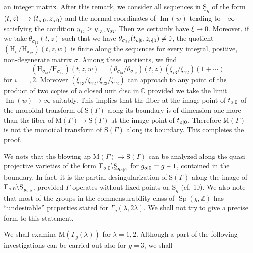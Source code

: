 an integer matrix. After this remark, we consider all sequences in $\underline{\mathrm{S}}_g$ of the form $(t,z)\longrightarrow(t_{o|0},z_{o|0})$ and the normal coordinates of $\operatorname{Im}(w)$ tending to $-\infty$ satisfying the condition $y_{12}\geq y_{13},y_{23}$. Then we certainly have $\xi\longrightarrow0$. Moreover, if we take $\theta_{\sigma_{12}}(t,z)$ such that we have $\theta_{\sigma_{12}}(t_{o|0},z_{o|0})\neq0$, the quotient $(\mathrm{H}_\sigma/\mathrm{H}_{\sigma_{12}})(t,z,w)$ is finite along the sequences for every integral, positive, non-degenerate matrix $\sigma$. Among these quotients, we find
\[
(\mathrm{H}_{\sigma_{i3}}/\mathrm{H}_{\sigma_{12}})(t,z,w)=(\theta_{\sigma_{i3}}/\theta_{\sigma_{12}})(t,z)(\xi_{i3}/\xi_{12})(1+\cdots)
\]
for $i=1,2$. Moreover $(\xi_{13}/\xi_{12},\xi_{23}/\xi_{12})$ can approach to any point of the product of two copies of a closed unit disc in $\mathbb{C}$ provided we take the limit $\operatorname{Im}(w)\longrightarrow\infty$ suitably. This implies that the fiber at the image point of $t_{o|0}$ of the monoidal transform of $\mathrm{S}(\Gamma)$ along its boundary is of dimension one more than the fiber of $\mathrm{M}(\Gamma)\longrightarrow\mathrm{S}(\Gamma)$ at the image point of $t_{o|0}$. Therefore $\mathrm{M}(\Gamma)$ is not the monoidal transform of $\mathrm{S}(\Gamma)$ along its boundary. This completes the proof.

We note that the blowing up $\mathrm{M}(\Gamma)\longrightarrow\mathrm{S}(\Gamma)$ can be analyzed along the quasi projective varieties of the form $\Gamma_{o|0}\backslash\underline{\mathrm{S}}_{g_{o|0}}$ for $g_{o|0}=g-1$, contained in the boundary. In fact, it is the partial desingularization of $\mathrm{S}(\Gamma)$ along the image of $\Gamma_{o|0}\backslash\underline{\mathrm{S}}_{g_{o|0}}$, provided $\Gamma$ operates without fixed points on $\underline{\mathrm{S}}_g$ (cf. 10). We also note that most of the groups in the commensurability class of $\operatorname{Sp}(g,\mathbb{Z})$ has ``undesirable'' properties stated for $\Gamma_g(\lambda,2\lambda)$. We shall not try to give a precise form to this statement.

We shall examine $\mathrm{M}(\Gamma_g(\lambda))$ for $\lambda=1,2$. Although a part of the following investigations can be carried out also for $g=3$, we shall
